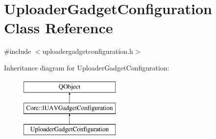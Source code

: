 \hypertarget{class_uploader_gadget_configuration}{\section{Uploader\-Gadget\-Configuration Class Reference}
\label{class_uploader_gadget_configuration}
}


{\ttfamily \#include $<$uploadergadgetconfiguration.\-h$>$}

Inheritance diagram for Uploader\-Gadget\-Configuration\-:\begin{figure}[H]
\begin{center}
\leavevmode
\includegraphics[height=3.000000cm]{class_uploader_gadget_configuration}
\end{center}
\end{figure}
